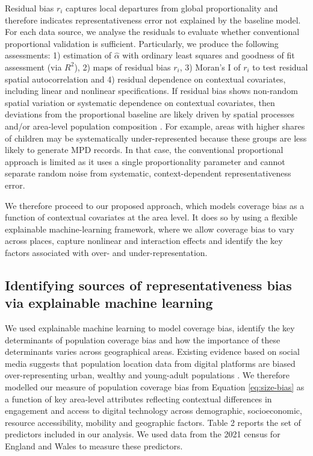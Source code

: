 \documentclass[]{rsos}%
\begin{document}
Residual bias \(r_i\) captures local departures from global
proportionality and therefore indicates representativeness error not
explained by the baseline model. For each data source, we analyse the
residuals to evaluate whether conventional proportional validation is
sufficient. Particularly, we produce the following assessments: 1)
estimation of \(\hat{\alpha}\) with ordinary least squares and goodness of
fit assessment (via \(R^2\)), 2) maps of residual bias \(r_i\), 3) Moran's I
of \(r_i\) to test residual spatial autocorrelation and 4) residual
dependence on contextual covariates, including linear and nonlinear
specifications. If residual bias shows non-random spatial variation or
systematic dependence on contextual covariates, then deviations from the
proportional baseline are likely driven by spatial processes and/or
area-level population composition \citep{Li2024}. For example, areas with higher shares
of children may be systematically under-represented because these groups
are less likely to generate MPD records. In that case, the conventional
proportional approach is limited as it uses a single proportionality
parameter and cannot separate random noise from systematic,
context-dependent representativeness error.

We therefore proceed to our proposed approach, which models coverage
bias as a function of contextual covariates at the area level. It does
so by using a flexible explainable machine-learning framework, where we
allow coverage bias to vary across places, capture nonlinear and
interaction effects and identify the key factors associated with over-
and under-representation.

\subsection{Identifying sources of representativeness bias via explainable machine learning}\label{sec-eml}

We used explainable machine learning to model coverage bias, identify
the key determinants of population coverage bias and how the importance
of these determinants varies across geographical areas. Existing
evidence based on social media suggests that population location data
from digital platforms are biased over-representing urban, wealthy and
young-adult populations \citep{blumenstock2010, wesolowski13-biases, schlosser21-biases}. We therefore modelled our measure of population
coverage bias from Equation \ref{eq:size-bias} as a function of key
area-level attributes reflecting contextual differences in engagement
and access to digital technology across demographic, socioeconomic,
resource accessibility, mobility and geographic factors. Table 2 reports
the set of predictors included in our analysis. We used data from the
2021 census for England and Wales to measure these predictors.
\end{document}
